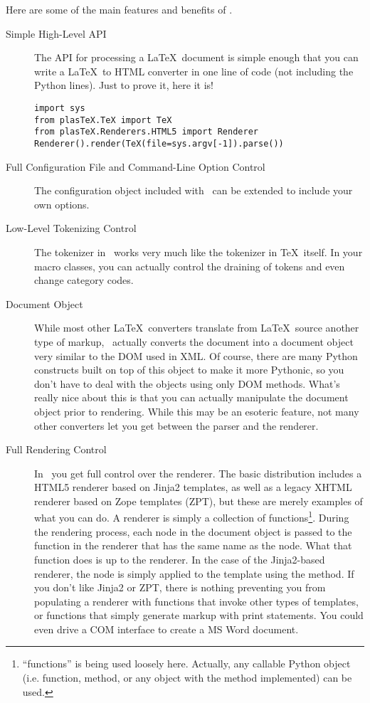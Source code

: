 Here are some of the main features and benefits of \plasTeX.
\begin{description}
\item[Simple High-Level API] The API for processing a \LaTeX\ document
is simple enough that you can write a \LaTeX\ to HTML converter
in one line of code (not including the Python  lines).
Just to prove it, here it is!
\begin{verbatim}
import sys
from plasTeX.TeX import TeX
from plasTeX.Renderers.HTML5 import Renderer
Renderer().render(TeX(file=sys.argv[-1]).parse())
\end{verbatim}

\item[Full Configuration File and Command-Line Option Control]
The configuration object included with \plasTeX\ can be extended to include
your own options.

\item[Low-Level Tokenizing Control] The tokenizer in \plasTeX\ works very
much like the tokenizer in \TeX\ itself.  In your macro classes, you
can actually control the draining of tokens and even change category codes.

\item[Document Object] While most other \LaTeX\ converters translate from
\LaTeX\ source another type of markup, \plasTeX\ actually converts the
document into a document object very similar to the DOM used in XML.
Of course, there are many Python constructs built on top of this object
to make it more Pythonic, so you don't have to deal with the objects using
only DOM methods. What's really nice about this is that you can actually
manipulate the document object prior to rendering.  While this may be an
esoteric feature, not many other converters let you get between the parser
and the renderer.

\item[Full Rendering Control] In \plasTeX\, you get full control over the
renderer. The basic distribution includes a HTML5 renderer based on Jinja2
templates, as well as a legacy XHTML renderer based on Zope templates (ZPT),
but these are merely examples of what you can do.
A renderer is simply a collection of functions\footnote{``functions'' is being
used loosely here.  Actually, any callable Python object (i.e. function, method,
or any object with the  method implemented) can be used.}.
During the rendering
process, each node in the document object is passed to the function
in the renderer that has the same name as the node.  What that function
does is up to the renderer.  In the case of the Jinja2-based renderer, the
node is simply applied to the template using the  method.
If you don't like Jinja2 or ZPT, there is nothing preventing you from populating
a renderer with functions that invoke other types of templates, or functions
that simply generate markup with print statements.  You could even drive
a COM interface to create a MS Word document.
\end{description}
